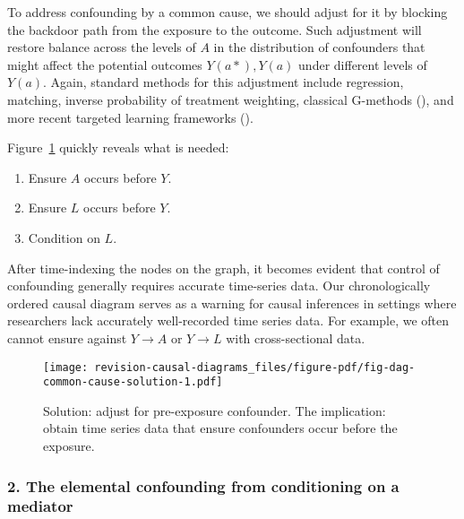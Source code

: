 \documentclass[
  singlecolumn,
  9pt]{article}
\providecommand{\tightlist}{%
  \setlength{\itemsep}{0pt}\setlength{\parskip}{0pt}}\usepackage{longtable,booktabs,array}
\begin{document}
To address confounding by a common cause, we should adjust for it by
blocking the backdoor path from the exposure to the outcome. Such
adjustment will restore balance across the levels of \(A\) in the
distribution of confounders that might affect the potential outcomes
\(Y(a*), Y(a)\) under different levels of \(Y(a)\). Again, standard
methods for this adjustment include regression, matching, inverse
probability of treatment weighting, classical G-methods
(), and more recent
targeted learning frameworks ().

Figure~\ref{fig-dag-common-cause-solution} quickly reveals what is
needed:

\begin{enumerate}
\def\labelenumi{\arabic{enumi}.}
\tightlist
\item
  Ensure \(A\) occurs before \(Y\).
\item
  Ensure \(L\) occurs before \(Y\).
\item
  Condition on \(L\).
\end{enumerate}

After time-indexing the nodes on the graph, it becomes evident that
control of confounding generally requires accurate time-series data. Our
chronologically ordered causal diagram serves as a warning for causal
inferences in settings where researchers lack accurately well-recorded
time series data. For example, we often cannot ensure against \(Y\to A\)
or \(Y \to L\) with cross-sectional data.

\begin{figure}

{\centering \texttt{[image: revision-causal-diagrams\_files/figure-pdf/fig-dag-common-cause-solution-1.pdf]}

}

\caption{\label{fig-dag-common-cause-solution}Solution: adjust for
pre-exposure confounder. The implication: obtain time series data that
ensure confounders occur before the exposure.}

\end{figure}

\subsubsection{2. The elemental confounding from conditioning on a
mediator}\label{the-elemental-confounding-from-conditioning-on-a-mediator}
\end{document}

